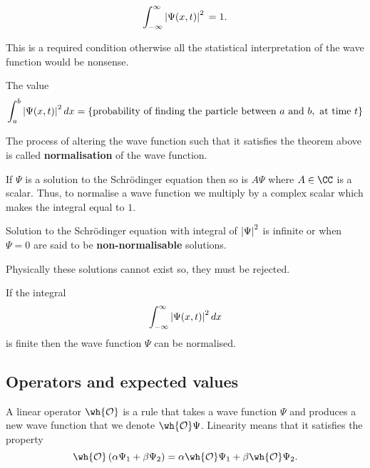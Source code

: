 \documentclass[12pt, a4paper]{article}
\begin{document}
\begin{mdthm}
    \[\int_{-\infty}^{\infty} \abs{\Psi(x,t)}^2 \, = 1.\]
\end{mdthm}

\begin{mdremark}
    This is a required condition otherwise all the statistical interpretation of the wave function would be nonsense.
\end{mdremark}

\begin{corollary}
    The value 
    \[\int_a^b \abs{\Psi(x,t)}^2 \, dx = \{\text{probability of finding the particle between } a \text{ and } b, \text{ at time } t\}\]
\end{corollary}

\begin{definition}
    The process of altering the wave function such that it satisfies the theorem above is called \textbf{normalisation} of the wave function.
\end{definition}

\begin{mdremark}
    If \(\Psi\) is a solution to the Schrödinger equation then so is \(A\Psi\) where \(A \in \CC\) is a scalar. Thus, to normalise a wave function we multiply by a complex scalar which makes the integral equal to \(1\).
\end{mdremark}

\begin{definition}
    Solution to the Schrödinger equation with integral of \(\abs{\Psi}^2\)  is infinite or when \(\Psi = 0\) are said to be \textbf{non-normalisable} solutions.
\end{definition}

\begin{mdnote}
    Physically these solutions cannot exist so, they must be rejected.
\end{mdnote}

\begin{mdthm}
    If the integral 
    \[\int_{-\infty}^{\infty} \abs{\Psi(x,t)}^2 \, dx\]
    is finite then the wave function \(\Psi\) can be normalised.
\end{mdthm}

\subsection{Operators and expected values}

\begin{definition}
    A linear operator \(\wh{\mathcal{O}}\) is a rule that takes a wave function \(\Psi\) and produces a new wave function that we denote \(\wh{\mathcal{O}}\Psi\). Linearity means that it satisfies the property 
    \[\wh{\mathcal{O}}\left( \alpha \Psi_1 +\beta \Psi_2 \right) = \alpha \wh{\mathcal{O}}\Psi_1 + \beta\wh{\mathcal{O}}\Psi_2.\]
\end{definition}
\end{document}
